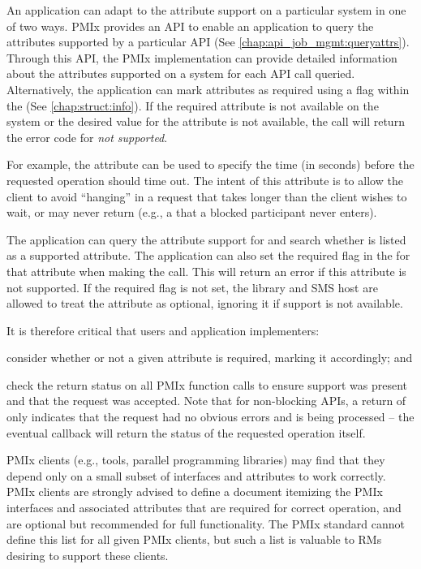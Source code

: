 An application can adapt to the attribute support on a particular system in one of two ways.
\ac{PMIx} provides an \ac{API} to enable an application to query the attributes
supported by a particular \ac{API} (See \ref{chap:api_job_mgmt:queryattrs}).
Through this \ac{API}, the \ac{PMIx} implementation can provide detailed information
about the attributes supported on a system for each \ac{API} call queried.
Alternatively, the application can mark attributes as
required using a flag within the  (See \ref{chap:struct:info}).
If the required attribute is
not available on the system or the desired value for the attribute is not available, the call will
return the error code for \textit{not supported}.

For example, the  attribute can be used to specify the time (in seconds) before the requested operation should time out. The intent of this attribute is to allow the client to avoid ``hanging'' in a request that takes longer than the client wishes to wait, or may never return (e.g., a  that a blocked participant never enters).

The application can query the attribute support for 
and search whether  is listed as a supported attribute.  The application can also
set the required flag in the  for that attribute when making the 
call. This will return an error if this attribute is not supported. If the required flag is not set,
the library and \ac{SMS} host are allowed to treat the attribute as optional, ignoring it if support
is not available.

It is therefore critical that users and application implementers:

\begin{compactalphaenum}
\item consider whether or not a given attribute is required, marking it accordingly; and

\item check the return status on all \ac{PMIx} function calls to ensure support was present and that the request was accepted. Note that for non-blocking \acp{API}, a return of  only indicates that the request had no obvious errors and is being processed – the eventual callback will return the status of the requested operation itself.
\end{compactalphaenum}

\ac{PMIx} clients (e.g., tools, parallel programming libraries) may find that they depend only on a small subset of interfaces and attributes to work correctly.
\ac{PMIx} clients are strongly advised to define a document itemizing the \ac{PMIx} interfaces and associated attributes that are required for correct operation, and are optional but recommended for full functionality.
The \ac{PMIx} standard cannot define this list for all given \ac{PMIx} clients, but such a list is valuable to \acp{RM} desiring to support these clients.

